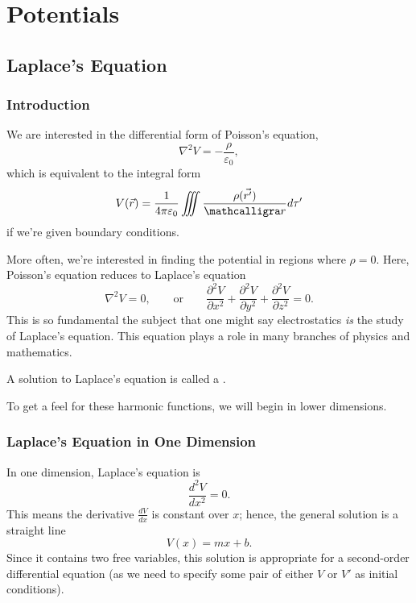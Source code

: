\chapter{Potentials}

\section{Laplace's Equation}

\subsection{Introduction}

We are interested in the differential form of Poisson's equation,
\[\nabla^2V=-\frac{\rho}{\varepsilon_0},\]
which is equivalent to the integral form
\[V(\vec{r})=\frac{1}{4\pi\varepsilon_0}\iiint\frac{\rho(\vec{r'})}{\scr}d\tau'\]
if we're given boundary conditions.

More often, we're interested in finding the potential in regions where $\rho=0$. Here, Poisson's equation reduces to Laplace's equation
\[\nabla^2V=0,\qquad\text{or}\qquad \frac{\partial^2V}{\partial x^2}+\frac{\partial^2V}{\partial y^2}+\frac{\partial^2V}{\partial z^2}=0.\]
This is so fundamental the subject that one might say electrostatics \textit{is} the study of Laplace's equation. This equation plays a role in many branches of physics and mathematics.

\begin{definition}
A solution to Laplace's equation is called a .
\end{definition}

To get a feel for these harmonic functions, we will begin in lower dimensions.

\subsection{Laplace's Equation in One Dimension}

In one dimension, Laplace's equation is
\[\frac{d^2V}{dx^2}=0.\]
This means the derivative $\frac{dV}{dx}$ is constant over $x$; hence, the general solution is a straight line
\[V(x)=mx+b.\]
Since it contains two free variables, this solution is appropriate for a second-order differential equation (as we need to specify some pair of either $V$ or $V'$ as initial conditions).


